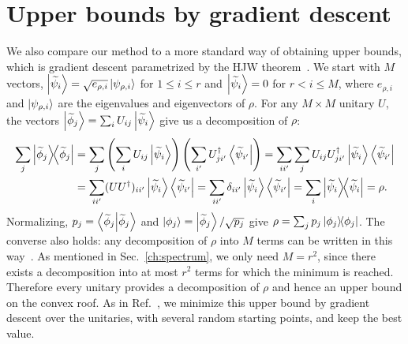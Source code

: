 \documentclass[11pt,a4paper]{report}
\newcounter{reptag}
\newif\iftags \tagsfalse   %
\newcommand{\reptagbox}[3]{\iftags\par\smallskip\noindent\refstepcounter{reptag}%
  \fcolorbox{#1}{#1!7}{\parbox{\dimexpr\linewidth-2\fboxsep-2\fboxrule\relax}{\small
  \textcolor{#1}{\textbf{[\thereptag]\ #2.}}\ #3}}\par\smallskip\fi}
\newcommand{\detail}[1]{\reptagbox{tagD}{More detail}{#1}}
\begin{document}
\section{Upper bounds by gradient descent}\label{app:HJW}
We also compare our method to a more standard way of obtaining upper bounds, which is gradient descent parametrized by the HJW theorem~\cite{HJW}. We start with $M$ vectors, $\ket{\widetilde{\psi}_i} = \sqrt{e_{\rho,i}} \ket{\psi_{\rho,i}}$ for $1 \leq i \leq r$ and $\ket{\widetilde{\psi}_i} = 0$ for $r < i \leq M$, where $e_{\rho,i}$ and $\ket{\psi_{\rho,i}}$ are the eigenvalues and eigenvectors of $\rho$. For any $M \times M$ unitary $U$,
the vectors $\ket{\widetilde{\phi}_j} = \sum_i U_{ij} \ket{\widetilde{\psi}_i}$ give us a decomposition of $\rho$:
\begin{align*}
    \sum_j \dyad{\widetilde{\phi}_j} &= \sum_j\left( \sum_i  U_{ij} \ket{\widetilde{\psi}_i} \right)\left( \sum_{i'}  U^\dagger_{j{i'}} \bra{\widetilde{\psi}_{i'}} \right)
    = \sum_{ii'} \sum_j U_{ij}U^\dagger_{j{i'}} \ket{\widetilde{\psi}_i}\bra{\widetilde{\psi}_{i'}} \\
    &= \sum_{ii'} (UU^\dagger)_{ii'} \ket{\widetilde{\psi}_i}\bra{\widetilde{\psi}_{i'}} = \sum_{ii'}\delta_{ii'}\ket{\widetilde{\psi}_i}\bra{\widetilde{\psi}_{i'}}= \sum_{i}\dyad{\widetilde{\psi}_i} = \rho.
\end{align*}
Normalizing, $p_j=\braket{\widetilde\phi_j}{\widetilde\phi_j}$ and $\ket{\phi_j}=\ket{\widetilde\phi_j}/\sqrt{p_j}$ give $\rho=\sum_jp_j\dyad{\phi_j}$. The converse also holds: any decomposition of $\rho$ into $M$ terms can be written in this way~\cite{HJW}. As mentioned in Sec.~\ref{ch:spectrum}, we only need $M=r^2$, since there exists a decomposition into at most $r^2$ terms for which the minimum is reached. Therefore every unitary provides a decomposition of $\rho$ and hence an upper bound on the convex roof. As in Ref.~\cite{Rothlisberger2009}, we minimize this upper bound by gradient descent over the unitaries, with several random starting points, and keep the best value.
\detail{Cite the converse (HJW, and Nielsen--Chuang~\cite{NielsenChuang2010}, Thm.~2.6) rather than proving it, and describe the gradient descent in a few lines (parametrisation of the unitary, optimiser, restarts, run times); implementation details go in Appendix~\ref{app:numerics}. The comparison of extraction and gradient descent is a result of its own: show where each wins and explain why extraction loses for $E_F$ (the SDP optimises a polynomial lower bound, not $S$ itself).}
\end{document}
